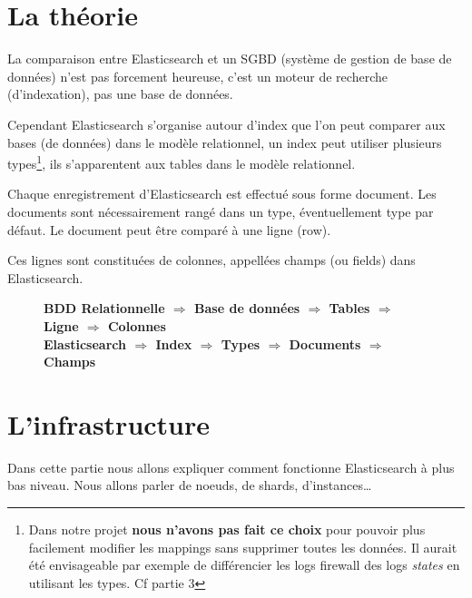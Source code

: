 \section{La théorie}
{%

La comparaison entre Elasticsearch et un SGBD (système de gestion de base de données) 
n'est pas forcement heureuse, c'est un moteur de recherche (d'indexation), pas une 
base de données. 

Cependant Elasticsearch s'organise autour d'index que l'on peut comparer aux bases (de données)
dans le modèle relationnel, un index peut utiliser plusieurs types\footnote{Dans 
notre projet \textbf{nous n'avons pas fait ce choix} pour pouvoir plus facilement 
modifier les mappings sans supprimer toutes les données. Il aurait été envisageable
par exemple de différencier les logs firewall des logs \textit{states} en utilisant 
les types. Cf partie 3}, ils s'apparentent aux tables dans le modèle relationnel. 

Chaque enregistrement d'Elasticsearch est effectué sous forme document. Les documents
sont nécessairement rangé dans un type, éventuellement type par défaut. Le document 
peut être comparé à une ligne (row). 

Ces lignes sont constituées de colonnes, appellées champs (ou fields) dans Elasticsearch.

\begin{figure}[H]
\textbf{BDD Relationnelle $\Rightarrow$ Base de données $\Rightarrow$ Tables $\Rightarrow$ Ligne $\Rightarrow$ Colonnes\\
Elasticsearch \hspace{7mm} $\Rightarrow$ \hspace{8mm }Index \hspace{8mm} $\Rightarrow$ \hspace{3mm}Types \hspace{3mm} $\Rightarrow$ Documents $\Rightarrow$ Champs}
\end{figure}


\section{L'infrastructure}
Dans cette partie nous allons expliquer comment fonctionne Elasticsearch à plus bas 
niveau. Nous allons parler de noeuds, de shards, d'instances\ldots

}
